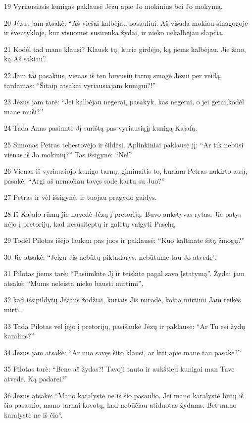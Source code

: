 \par 19 Vyriausiasis kunigas paklausė Jėzų apie Jo mokinius bei Jo mokymą. 
\par 20 Jėzus jam atsakė: “Aš viešai kalbėjau pasauliui. Aš visada mokiau sinagogoje ir šventykloje, kur visuomet susirenka žydai, ir nieko nekalbėjau slapčia. 
\par 21 Kodėl tad mane klausi? Klausk tų, kurie girdėjo, ką jiems kalbėjau. Jie žino, ką Aš sakiau”. 
\par 22 Jam tai pasakius, vienas iš ten buvusių tarnų smogė Jėzui per veidą, tardamas: “Šitaip atsakai vyriausiajam kunigui?!” 
\par 23 Jėzus jam tarė: “Jei kalbėjau negerai, pasakyk, kas negerai, o jei gerai,­kodėl mane muši?” 
\par 24 Tada Anas pasiuntė Jį surištą pas vyriausiąjį kunigą Kajafą. 
\par 25 Simonas Petras tebestovėjo ir šildėsi. Aplinkiniai paklausė jį: “Ar tik nebūsi vienas iš Jo mokinių?” Tas išsigynė: “Ne!” 
\par 26 Vienas iš vyriausiojo kunigo tarnų, giminaitis to, kuriam Petras nukirto ausį, pasakė: “Argi aš nemačiau tavęs sode kartu su Juo?” 
\par 27 Petras ir vėl išsigynė, ir tuojau pragydo gaidys. 
\par 28 Iš Kajafo rūmų jie nuvedė Jėzų į pretorijų. Buvo ankstyvas rytas. Jie patys nėjo į pretorijų, kad nesusiteptų ir galėtų valgyti Paschą. 
\par 29 Todėl Pilotas išėjo laukan pas juos ir paklausė: “Kuo kaltinate šitą žmogų?” 
\par 30 Jie atsakė: “Jeigu Jis nebūtų piktadarys, nebūtume tau Jo atvedę”. 
\par 31 Pilotas jiems tarė: “Pasiimkite Jį ir teiskite pagal savo Įstatymą”. Žydai jam atsakė: “Mums neleista nieko bausti mirtimi”,­ 
\par 32 kad išsipildytų Jėzaus žodžiai, kuriais Jis nurodė, kokia mirtimi Jam reikės mirti. 
\par 33 Tada Pilotas vėl įėjo į pretorijų, pasišaukė Jėzų ir paklausė: “Ar Tu esi žydų karalius?” 
\par 34 Jėzus jam atsakė: “Ar nuo savęs šito klausi, ar kiti apie mane tau pasakė?” 
\par 35 Pilotas tarė: “Bene aš žydas?! Tavoji tauta ir aukštieji kunigai man Tave atvedė. Ką padarei?” 
\par 36 Jėzus atsakė: “Mano karalystė ne iš šio pasaulio. Jei mano karalystė būtų iš šio pasaulio, mano tarnai kovotų, kad nebūčiau atiduotas žydams. Bet mano karalystė ne iš čia”. 
